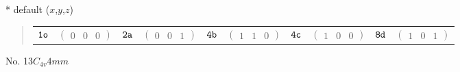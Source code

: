 \documentclass[fleqn,9pt,landscape]{jsarticle}
\begin{document}
* default ($x$,$y$,$z$)
\begin{quote}
\begin{tabular}{cccccccccc}
$ {\tt 1o} $ & $ \begin{pmatrix} 0 & 0 & 0 \end{pmatrix} $ & $ {\tt 2a} $ & $ \begin{pmatrix} 0 & 0 & 1 \end{pmatrix} $ & $ {\tt 4b} $ & $ \begin{pmatrix} 1 & 1 & 0 \end{pmatrix} $ & $ {\tt 4c} $ & $ \begin{pmatrix} 1 & 0 & 0 \end{pmatrix} $ & $ {\tt 8d} $ & $ \begin{pmatrix} 1 & 0 & 1 \end{pmatrix} $
\end{tabular}
\end{quote}
\newpage
No. 13\quad$C_{4v}$\quad$4mm$\quad[ tetragonal ]
\end{document}
